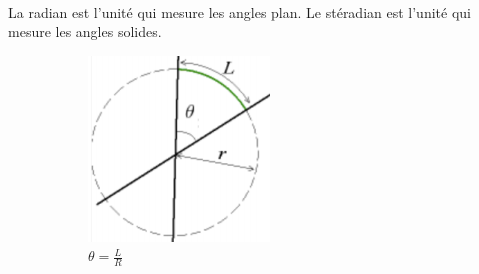 \documentclass{article}
\begin{document}
            \paragraph{}
            La radian est l'unité qui mesure les angles plan. Le stéradian est l'unité qui mesure les angles solides.

            \begin{figure}[H]
                \centering
                \begin{subfigure}[b]{0.15\linewidth}
                    \includegraphics[width=\linewidth]{./images/010-radian.png}
                    \caption{$\theta = \frac{L}{R}$}
                \end{subfigure}
                \begin{subfigure}[b]{0.15\linewidth}

\end{subfigure}
\end{figure}
\end{document}
